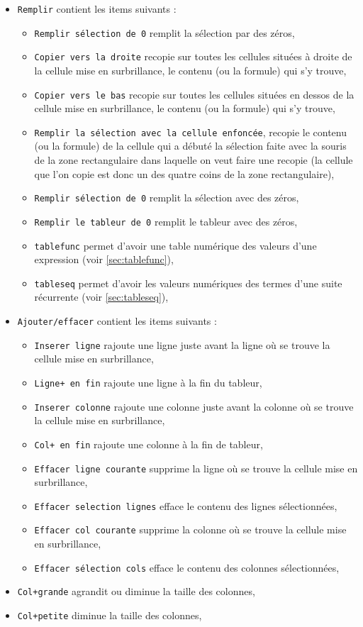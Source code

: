 \documentclass[a4paper,11pt]{book}
\begin{document}
\begin{itemize}
\item {\tt Remplir} contient les items suivants :
\begin{itemize}
\item {\tt Remplir s\'election de 0} remplit la s\'election par des z\'eros,
\item {\tt Copier vers la droite} recopie sur toutes les cellules situ\'ees 
\`a droite de la cellule mise en surbrillance, le contenu (ou la formule) qui 
s'y trouve, 
\item {\tt Copier vers le bas} recopie sur toutes les cellules situ\'ees 
en dessos de la cellule mise en surbrillance, le contenu (ou la formule) qui 
s'y trouve,
\item {\tt Remplir la s\'election avec la cellule enfonc\'ee}, recopie le 
contenu (ou la formule) de la cellule qui a d\'ebut\'e la 
s\'election faite avec la souris de la zone rectangulaire dans laquelle on veut
faire une recopie (la cellule que l'on copie est donc un des quatre coins de la
zone rectangulaire),
\item {\tt Remplir s\'election de 0} remplit la s\'election avec des z\'eros,
\item {\tt Remplir le tableur de 0} remplit le tableur avec des z\'eros,
\item {\tt tablefunc} permet d'avoir une table num\'erique des valeurs d'une 
expression (voir \ref{sec:tablefunc}),
\item {\tt tableseq} permet d'avoir les valeurs  num\'eriques des termes
 d'une suite r\'ecurrente (voir \ref{sec:tableseq}),
\end{itemize}
\item {\tt Ajouter/effacer} contient les items suivants :
\begin{itemize}
\item {\tt Inserer ligne} rajoute une ligne juste avant la ligne o\`u se trouve
la cellule mise en surbrillance,
\item {\tt Ligne+ en fin}  rajoute une ligne \`a la fin du tableur,
\item {\tt Inserer colonne} rajoute une colonne juste avant la colonne o\`u se 
trouve la cellule mise en surbrillance,
\item {\tt Col+ en fin}  rajoute une colonne \`a la fin de tableur,
\item {\tt Effacer ligne courante}  supprime la ligne o\`u se trouve la cellule
mise en surbrillance,
\item {\tt Effacer selection lignes} efface le contenu des lignes 
s\'electionn\'ees,
\item {\tt Effacer col courante} supprime la colonne o\`u se trouve la cellule 
mise en surbrillance,
\item {\tt Effacer s\'election cols} efface le contenu des colonnes 
s\'electionn\'ees,
\end{itemize}

\item {\tt Col+grande} agrandit ou diminue la taille des colonnes,
\item  {\tt Col+petite} diminue la taille des colonnes,
\end{itemize}
\end{document}
